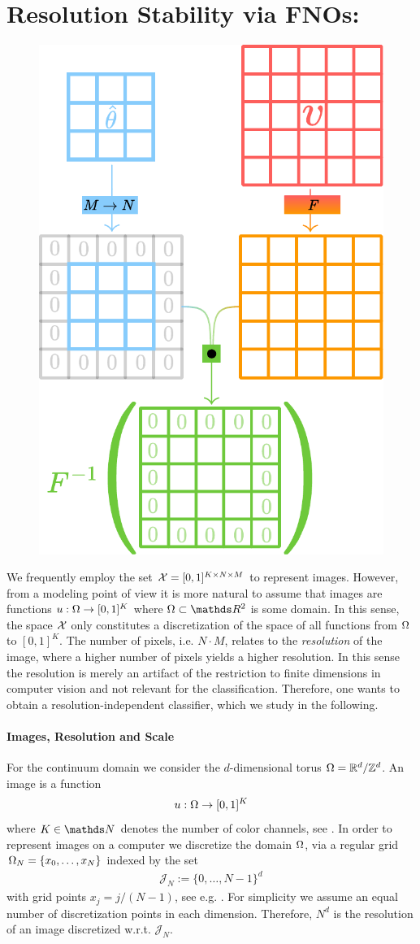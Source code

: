 \section{Resolution Stability via FNOs: \cite{kabri2023resolution}}\label{sec:FNO}
%
\setlength\intextsep{0pt}
\begin{figure}
\centering
\includegraphics[width=.4\textwidth]{atelier/FNO/trigo.pdf}
\end{figure}
%
We frequently employ the set $\mathcal{X}=[0,1]^{K\times N\times M}$ to represent images. However, from a modeling point of view it is more natural to assume that images are functions $u:\Omega\to[0,1]^K$ where $\domain\subset\R^2$ is some domain. In this sense, the space $\mathcal{X}$ only constitutes a discretization of the space of all functions from $\Omega$ to $[0,1]^K$. The number of pixels, i.e. $N\cdot M$, relates to the \emph{resolution} of the image, where a higher number of pixels yields a higher resolution. In this sense the resolution is merely an artifact of the restriction to finite dimensions in computer vision and not relevant for the classification. Therefore, one wants to obtain a resolution-independent classifier, which we study in the following.
%
\paragraph{Images, Resolution and Scale}
%
%
For the continuum domain we consider the $d$-dimensional torus $\Omega = \mathbb{R}^d / \mathbb{Z}^d$. An image is a function 
%
\begin{align*}
u:\Omega\to[0,1]^K
\end{align*}
%
where $K\in\N$ denotes the number of color channels, see \cite{gonzales1987digital}. In order to represent images on a computer we discretize the domain $\Omega$, via a regular grid $\Omega_N = \{x_0,\ldots,x_N\}$ indexed by the set
%
\begin{align*}
\mathcal{J}_N := \{0,\ldots, N-1\}^d
\end{align*}
%
with grid points $x_j = j/(N-1)$, see e.g. \cite{kabri2022FNO, kovachki2021universal}. For simplicity we assume an equal number of discretization points in each dimension. Therefore, $N^d$ is the resolution of an image discretized w.r.t. $\mathcal{J}_N$. 

